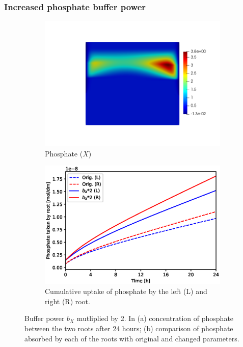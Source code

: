 \documentclass[11pt]{article}
\begin{document}
\FloatBarrier
\subsubsection{Increased phosphate buffer power}
\begin{figure}[!htb]
\centering
\begin{subfigure}[t]{0.45\textwidth}
    \includegraphics[trim= 100 100 60 100,width=\textwidth]{Figures/X_bXtimes2.png}
    \caption{Phosphate ($X$)}
\end{subfigure}
\qquad
\begin{subfigure}[t]{0.45\textwidth}
    \includegraphics[width=\textwidth]{Figures/bxtimes2.eps}
    \caption{Cumulative uptake of phosphate by the left (L) and right (R) root.}
\end{subfigure}

\caption{Buffer power $b_X$ mutliplied by 2. In (a) concentration of phosphate between the two roots after 24 hours; (b) comparison of phosphate absorbed by each of the roots with original and changed parameters.}
\end{figure}
\end{document}
